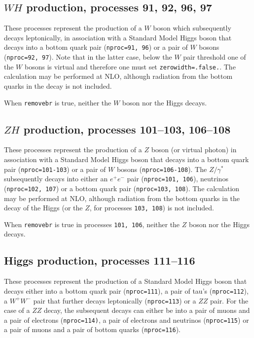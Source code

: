 \documentclass[12pt]{article}
\begin{document}
\subsection{$WH$ production, processes 91, 92, 96, 97}
\label{subsec:wh}

These processes represent the production of a $W$ boson which subsequently
decays leptonically, in association with a Standard Model Higgs boson that
decays into a bottom quark pair ({\tt nproc=91, 96}) or a pair of $W$ bosons
({\tt nproc=92, 97}).  Note that in the latter case, below the $W$ pair threshold
one of the $W$ bosons is virtual and therefore one must set {\tt zerowidth=.false.}.
The calculation may be performed at NLO, although radiation from the
bottom quarks in the decay is not included.

When {\tt removebr} is true, neither the $W$ boson nor the Higgs decays.

\subsection{$ZH$ production, processes 101--103, 106--108}
\label{subsec:zh}

These processes represent the production of a $Z$ boson (or virtual photon)
in association with a Standard Model Higgs boson that
decays into a bottom quark pair ({\tt nproc=101-103}) or a pair of $W$ bosons
({\tt nproc=106-108}). The $Z/\gamma^*$ subsequently decays into 
either an $e^+ e^-$ pair ({\tt nproc=101, 106}), neutrinos ({\tt nproc=102, 107})
or a bottom quark pair ({\tt nproc=103, 108}).
The calculation may be performed at NLO, although radiation from the
bottom quarks in the decay of the Higgs (or the $Z$, for processes
{\tt 103, 108}) is not included.

When {\tt removebr} is true in processes {\tt 101, 106}, neither the $Z$ boson
nor the Higgs decays.

\subsection{Higgs production, processes 111--116}
\label{subsec:h}

These processes represent the production of a Standard Model Higgs
boson that decays either into a bottom quark
pair ({\tt nproc=111}), a pair of tau's ({\tt nproc=112}), a $W^+W^-$ pair
that further decays leptonically ({\tt nproc=113}) or a $ZZ$ pair.
For the case of a $ZZ$ decay,
the subsequent decays can either be into a pair of muons and a pair of electrons
({\tt nproc=114)}, a pair of electrons and neutrinos ({\tt nproc=115}) or
a pair of muons and a pair of bottom quarks ({\tt nproc=116}).
\end{document}
